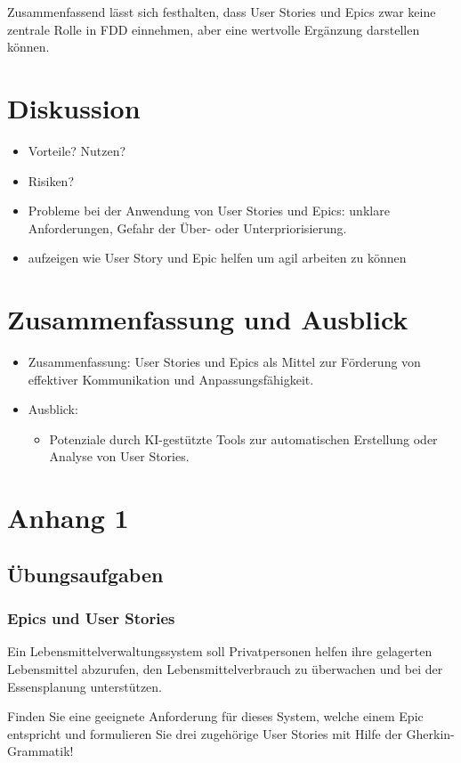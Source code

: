 \documentclass[acmtog]{acmart}
\begin{document}
Zusammenfassend lässt sich festhalten, dass User Stories und Epics zwar keine zentrale Rolle in FDD einnehmen, aber eine wertvolle Ergänzung darstellen können.

\section{Diskussion}

\begin{itemize}
	\item Vorteile? Nutzen?
	\item Risiken?
	\item Probleme bei der Anwendung von User Stories und Epics: unklare Anforderungen, Gefahr der Über- oder Unterpriorisierung.
	\item aufzeigen wie User Story und Epic helfen um agil arbeiten zu können
\end{itemize}

\section{Zusammenfassung und Ausblick}

\begin{itemize}
	\item Zusammenfassung: User Stories und Epics als Mittel zur Förderung von effektiver Kommunikation und Anpassungsfähigkeit.
	\item Ausblick:
	      \begin{itemize}
		      \item Potenziale durch KI-gestützte Tools zur automatischen Erstellung oder Analyse von User Stories.
	      \end{itemize}
\end{itemize}





\appendix

\section{Anhang 1}

\subsection{Übungsaufgaben}
\subsubsection{Epics und User Stories}
Ein Lebensmittelverwaltungssystem soll Privatpersonen helfen ihre gelagerten Lebensmittel abzurufen,
den Lebensmittelverbrauch zu überwachen und bei der Essensplanung unterstützen.

Finden Sie eine geeignete Anforderung für dieses System, welche einem Epic entspricht und formulieren Sie drei zugehörige
User Stories mit Hilfe der Gherkin-Grammatik!
\end{document}
